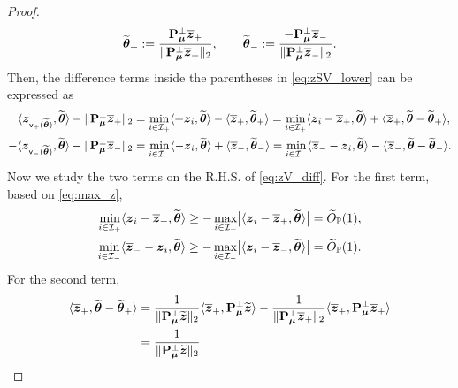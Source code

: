 \begin{proof}
\begin{equation}\label{eq:wt_theta_pm}
    \wt\vtheta_+ := \frac{\bP_{\vmu}^\perp \bar\zz_+}{\| \bP_{\vmu}^\perp \bar\zz_+ \|_2},
    \qquad
    \wt\vtheta_- := \frac{-\bP_{\vmu}^\perp \bar\zz_-}{\| \bP_{\vmu}^\perp \bar\zz_- \|_2}.
\end{equation}
Then, the difference terms inside the parentheses in \cref{eq:zSV_lower} can be expressed as
\begin{equation}\label{eq:zV_diff}
    \begin{aligned}
        \phantom{+} \< \zz_{\mathsf{v}_+(\wt\vtheta)}, \wt\vtheta \> - \| \bP_{\vmu}^\perp \bar\zz_+ \|_2
        & = \min_{i \in \mathcal{I}_+} \< + \zz_i, \wt\vtheta \> - \< \bar\zz_+, \wt\vtheta_+ \>
        = \min_{i \in \mathcal{I}_+} \< \zz_i - \bar\zz_+, \wt\vtheta \> + \< \bar\zz_+, \wt\vtheta - \wt\vtheta_+ \>,
        \\
        - \< \zz_{\mathsf{v}_-(\wt\vtheta)}, \wt\vtheta \> - \| \bP_{\vmu}^\perp \bar\zz_- \|_2
        & = \min_{i \in \mathcal{I}_-} \< - \zz_i, \wt\vtheta \> + \< \bar\zz_-, \wt\vtheta_- \>
        = \min_{i \in \mathcal{I}_-} \< \bar\zz_- - \zz_i, \wt\vtheta \> - \< \bar\zz_-, \wt\vtheta - \wt\vtheta_- \>.
    \end{aligned}
\end{equation}
Now we study the two terms on the R.H.S. of \cref{eq:zV_diff}. For the first term, based on \cref{eq:max_z},
\begin{equation}\label{eq:zV_diff_1}
    \begin{aligned}
        \min_{i \in \mathcal{I}_+} \< \zz_i - \bar\zz_+, \wt\vtheta \>
        \ge -\max_{i \in \mathcal{I}_+} \bigl| \< \zz_i - \bar\zz_+, \wt\vtheta \> \bigr|
        & = \wt O_\P(1), \\
        \min_{i \in \mathcal{I}_-} \< \bar\zz_- - \zz_i, \wt\vtheta \>
        \ge -\max_{i \in \mathcal{I}_-} \bigl| \< \zz_i - \bar\zz_-, \wt\vtheta \> \bigr|
        & = \wt O_\P(1).
    \end{aligned}
\end{equation}
For the second term,
\begin{equation}\label{eq:zV_diff_2+}
    \begin{aligned}
        \< \bar\zz_+, \wt\vtheta - \wt\vtheta_+ \>
        & =
        \frac{1}{\| \bP_{\vmu}^\perp \wt\zz \|_2} \< \bar\zz_+, \bP_{\vmu}^\perp \wt\zz \> 
        - \frac{1}{\| \bP_{\vmu}^\perp \bar\zz_+ \|_2} \< \bar\zz_+, \bP_{\vmu}^\perp \bar\zz_+ \> \\
        & = 
        \frac{1}{\| \bP_{\vmu}^\perp \wt\zz \|_2} 

\end{aligned}
\end{equation}
\end{proof}

